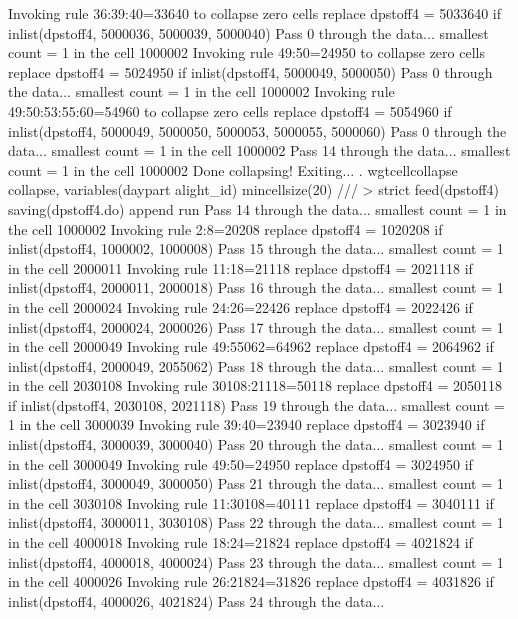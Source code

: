   Invoking rule 36:39:40=33640 to collapse zero cells
  replace dpstoff4 = 5033640 if inlist(dpstoff4, 5000036, 5000039, 5000040)
Pass 0 through the data...
  smallest count = 1 in the cell      1000002
  Invoking rule 49:50=24950 to collapse zero cells
  replace dpstoff4 = 5024950 if inlist(dpstoff4, 5000049, 5000050)
Pass 0 through the data...
  smallest count = 1 in the cell      1000002
  Invoking rule 49:50:53:55:60=54960 to collapse zero cells
  replace dpstoff4 = 5054960 if inlist(dpstoff4, 5000049, 5000050, 5000053, 5000055, 5000060)
Pass 0 through the data...
  smallest count = 1 in the cell      1000002
Pass 14 through the data...
  smallest count = 1 in the cell      1000002
  Done collapsing! Exiting...
{\smallskip}
. wgtcellcollapse collapse, variables(daypart alight_id) mincellsize(20) ///
>         strict feed(dpstoff4) saving(dpstoff4.do) append run
Pass 14 through the data...
  smallest count = 1 in the cell      1000002
  Invoking rule 2:8=20208
  replace dpstoff4 = 1020208 if inlist(dpstoff4, 1000002, 1000008)
Pass 15 through the data...
  smallest count = 1 in the cell      2000011
  Invoking rule 11:18=21118
  replace dpstoff4 = 2021118 if inlist(dpstoff4, 2000011, 2000018)
Pass 16 through the data...
  smallest count = 1 in the cell      2000024
  Invoking rule 24:26=22426
  replace dpstoff4 = 2022426 if inlist(dpstoff4, 2000024, 2000026)
Pass 17 through the data...
  smallest count = 1 in the cell      2000049
  Invoking rule 49:55062=64962
  replace dpstoff4 = 2064962 if inlist(dpstoff4, 2000049, 2055062)
Pass 18 through the data...
  smallest count = 1 in the cell      2030108
  Invoking rule 30108:21118=50118
  replace dpstoff4 = 2050118 if inlist(dpstoff4, 2030108, 2021118)
Pass 19 through the data...
  smallest count = 1 in the cell      3000039
  Invoking rule 39:40=23940
  replace dpstoff4 = 3023940 if inlist(dpstoff4, 3000039, 3000040)
Pass 20 through the data...
  smallest count = 1 in the cell      3000049
  Invoking rule 49:50=24950
  replace dpstoff4 = 3024950 if inlist(dpstoff4, 3000049, 3000050)
Pass 21 through the data...
  smallest count = 1 in the cell      3030108
  Invoking rule 11:30108=40111
  replace dpstoff4 = 3040111 if inlist(dpstoff4, 3000011, 3030108)
Pass 22 through the data...
  smallest count = 1 in the cell      4000018
  Invoking rule 18:24=21824
  replace dpstoff4 = 4021824 if inlist(dpstoff4, 4000018, 4000024)
Pass 23 through the data...
  smallest count = 1 in the cell      4000026
  Invoking rule 26:21824=31826
  replace dpstoff4 = 4031826 if inlist(dpstoff4, 4000026, 4021824)
Pass 24 through the data...
